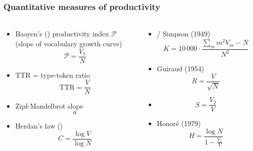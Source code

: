 \documentclass[handout,notes=show,t]{beamer} %
\begin{document}
\begin{frame}
  \frametitle{Quantitative measures of productivity}
  \framesubtitle{\citep{Tweedie:Baayen:98,Baayen:01}}

  \footnotesize
  \begin{columns}[c]
        \begin{column}{6cm}
      \ungap[1.2]
      \begin{itemize}
      \item Baayen's (\citeyear{Baayen:91}) productivity index $\mathcal{P}$\\
        (slope of vocabulary growth curve)
        \[
        \mathcal{P} = \frac{V_1}{N}
        \]
      \item TTR = type-token ratio
        \[
        \text{TTR} = \frac{V}{N}
        \]
      \item Zipf-Mandelbrot slope
        \[
        a
        \]
      \item Herdan's law (\citeyear{Herdan:64})
        \[
        C = \frac{\log V}{\log N}
        \]
      \end{itemize}
    \end{column}
    \begin{column}{6cm}
      \begin{itemize}
      \item<2-> \citet{Yule:44} /  Simpson (1949) 
        \[
          K = 10\,000\cdot \frac{\sum_m m^2 V_m - N}{N^2}
        \]
      \item<2-> Guiraud (1954)
        \[
          R = \frac{V}{\sqrt{N}}
        \]
      \item<2-> \citet{Sichel:75}
        \[
          S = \frac{V_2}{V}
        \]
      \item<2-> Honoré (1979)
        \[
          H = \frac{\log N}{1 - \frac{V_1}{V}}
        \]
      \end{itemize}
    \end{column}
  \end{columns}  
\end{frame}
\end{document}
